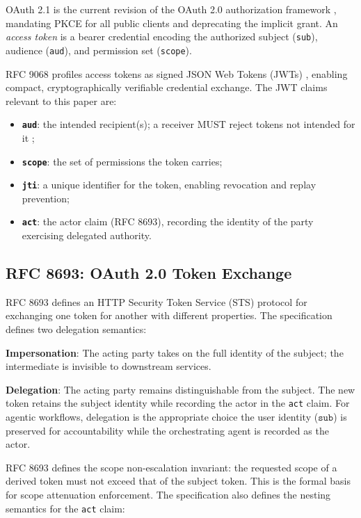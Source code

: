 \documentclass[journal]{IEEEtran}
\begin{document}
OAuth 2.1 \cite{oauth21} is the current revision of the OAuth 2.0 authorization
framework \cite{rfc6749}, mandating PKCE for all public clients and deprecating
the implicit grant. An \textit{access token} is a bearer credential encoding the
authorized subject (\texttt{sub}), audience (\texttt{aud}), and permission set
(\texttt{scope}).

RFC 9068 \cite{rfc9068} profiles access tokens as signed JSON Web Tokens
(JWTs) \cite{rfc7519}, enabling compact, cryptographically verifiable
credential exchange. The JWT claims relevant to this paper are:
\begin{itemize}
  \item \textbf{\texttt{aud}}: the intended recipient(s); a receiver MUST reject
        tokens not intended for it \cite{rfc9068};
  \item \textbf{\texttt{scope}}: the set of permissions the token carries;
  \item \textbf{\texttt{jti}}: a unique identifier for the token, enabling
        revocation and replay prevention;
  \item \textbf{\texttt{act}}: the actor claim (RFC 8693), recording the identity
        of the party exercising delegated authority.
\end{itemize}

\subsection{RFC 8693: OAuth 2.0 Token Exchange}

RFC 8693 \cite{rfc8693} defines an HTTP Security Token Service (STS) protocol
for exchanging one token for another with different properties. The specification
defines two delegation semantics:

\textbf{Impersonation}: The acting party takes on the full identity of the
subject; the intermediate is invisible to downstream services.

\textbf{Delegation}: The acting party remains distinguishable from the subject.
The new token retains the subject identity while recording the actor in the
\texttt{act} claim. For agentic workflows, delegation is the appropriate
choice the user identity ($\texttt{sub}$) is preserved for accountability while
the orchestrating agent is recorded as the actor.

RFC 8693 defines the scope non-escalation invariant: the requested scope of a
derived token must not exceed that of the subject token. This is the formal
basis for scope attenuation enforcement. The specification also defines the
nesting semantics for the \texttt{act} claim:
\end{document}
